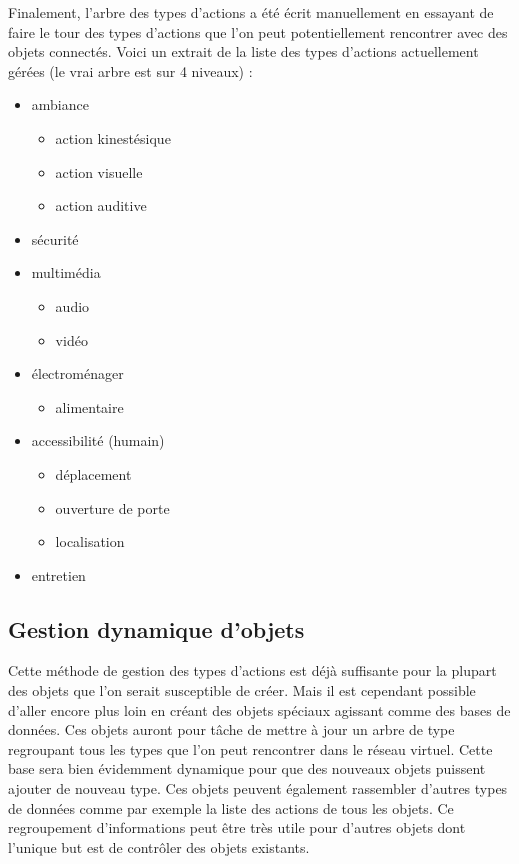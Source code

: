 		Finalement, l'arbre des types d'actions a été écrit manuellement en essayant de faire le tour
		des types d'actions que l'on peut potentiellement rencontrer avec des objets connectés. Voici
		un extrait de la liste des types d'actions actuellement gérées (le vrai arbre est sur 4 
		niveaux) :
		\begin{itemize}
			\item ambiance
			\begin{itemize}
				\item action kinestésique
				\item action visuelle
				\item action auditive
			\end{itemize}
			\item sécurité
			\item multimédia
			\begin{itemize}
				\item audio
				\item vidéo
			\end{itemize}
			\item électroménager
			\begin{itemize}
				\item alimentaire
			\end{itemize}
			\item accessibilité (humain)
			\begin{itemize}
				\item déplacement
				\item ouverture de porte
				\item localisation
			\end{itemize}
			\item entretien
		\end{itemize}

	\subsection{Gestion dynamique d’objets}
		Cette méthode de gestion des types d'actions est déjà suffisante pour la plupart des objets
		que l'on serait susceptible de créer. Mais il est cependant possible d'aller encore plus loin
		en créant des objets spéciaux agissant comme des bases de données. Ces objets auront pour
		tâche de mettre à jour un arbre de type regroupant tous les types que l'on peut rencontrer
		dans le réseau virtuel. Cette base sera bien évidemment dynamique pour que des nouveaux objets
		puissent ajouter de nouveau type. Ces objets peuvent également rassembler d'autres types de
		données comme par exemple la liste des actions de tous les objets. Ce regroupement
		d'informations peut être très utile pour d'autres objets dont l'unique but est de contrôler
		des objets existants.
		
